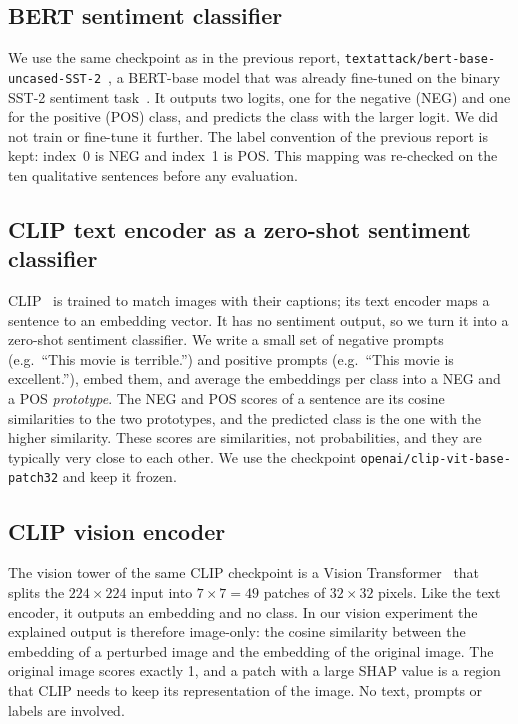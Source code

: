 \documentclass[11pt,a4paper]{article}
\begin{document}
\subsection{BERT sentiment classifier}

We use the same checkpoint as in the previous report,
\texttt{textattack/bert-base-uncased-SST-2}~\cite{devlin2019,morris2020}, a BERT-base model
that was already fine-tuned on the binary SST-2 sentiment task~\cite{socher2013,wang2019}.
It outputs two logits, one for the negative (NEG) and one for the positive (POS) class, and
predicts the class with the larger logit. We did not train or fine-tune it further. The
label convention of the previous report is kept: index~0 is NEG and index~1 is POS. This
mapping was re-checked on the ten qualitative sentences before any evaluation.

\subsection{CLIP text encoder as a zero-shot sentiment classifier}

CLIP~\cite{radford2021} is trained to match images with their captions; its text encoder
maps a sentence to an embedding vector. It has no sentiment output, so we turn it into a
zero-shot sentiment classifier. We write a small set of negative prompts (e.g.\ ``This movie
is terrible.'') and positive prompts (e.g.\ ``This movie is excellent.''), embed them, and
average the embeddings per class into a NEG and a POS \emph{prototype}. The NEG and POS
scores of a sentence are its cosine similarities to the two prototypes, and the predicted
class is the one with the higher similarity. These scores are similarities, not
probabilities, and they are typically very close to each other. We use the checkpoint
\texttt{openai/clip-vit-base-patch32} and keep it frozen.

\subsection{CLIP vision encoder}

The vision tower of the same CLIP checkpoint is a Vision Transformer~\cite{dosovitskiy2021}
that splits the $224\times224$ input into $7\times7=49$ patches of $32\times32$ pixels.
Like the text encoder, it outputs an embedding and no class. In our vision experiment the
explained output is therefore image-only: the cosine similarity between the embedding of a
perturbed image and the embedding of the original image. The original image scores exactly
1, and a patch with a large SHAP value is a region that CLIP needs to keep its
representation of the image. No text, prompts or labels are involved.
\end{document}
